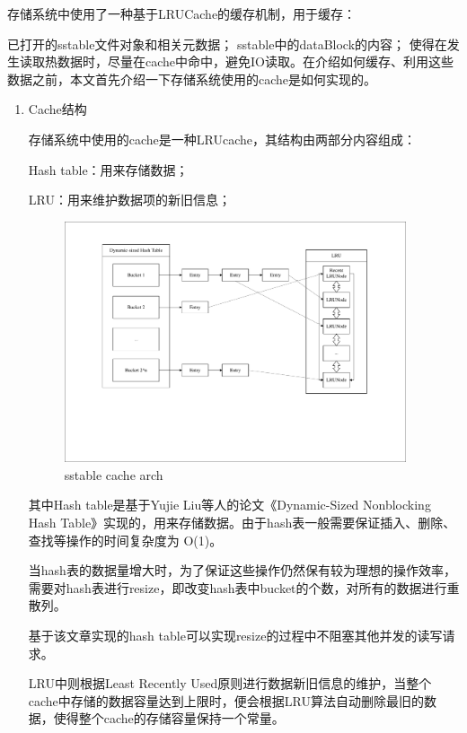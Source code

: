 		存储系统中使用了一种基于LRUCache的缓存机制，用于缓存：
		
		已打开的sstable文件对象和相关元数据；
		sstable中的dataBlock的内容；
		使得在发生读取热数据时，尽量在cache中命中，避免IO读取。在介绍如何缓存、利用这些数据之前，本文首先介绍一下存储系统使用的cache是如何实现的。
		
		\begin{enumerate}
			\item Cache结构 
			
			存储系统中使用的cache是一种LRUcache，其结构由两部分内容组成：

			Hash table：用来存储数据；
			
			LRU：用来维护数据项的新旧信息；

			\begin{figure}[H]
				\centering
				\includegraphics[width=0.95\textwidth]{pdf/cache_arch.pdf}
				\caption{sstable cache arch}
				\label{sstable_cache_arch}
			\end{figure}

			其中Hash table是基于Yujie Liu等人的论文《Dynamic-Sized Nonblocking Hash Table》实现的，用来存储数据。由于hash表一般需要保证插入、删除、查找等操作的时间复杂度为 O(1)。

当hash表的数据量增大时，为了保证这些操作仍然保有较为理想的操作效率，需要对hash表进行resize，即改变hash表中bucket的个数，对所有的数据进行重散列。

基于该文章实现的hash table可以实现resize的过程中不阻塞其他并发的读写请求。

LRU中则根据Least Recently Used原则进行数据新旧信息的维护，当整个cache中存储的数据容量达到上限时，便会根据LRU算法自动删除最旧的数据，使得整个cache的存储容量保持一个常量。



\end{enumerate}
